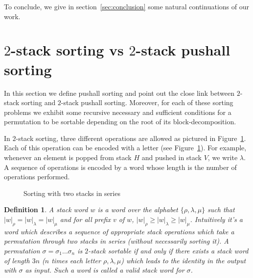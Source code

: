 \documentclass[11pt]{article}
\newtheorem{defn}[thm]{Definition}
\begin{document}
To conclude, we give in section~\ref{sec:conclusion} some natural continuations of our work.


\section{$2$-stack sorting vs $2$-stack pushall sorting}

In this section we define pushall sorting and point out the close link between $2$-stack sorting and $2$-stack pushall sorting. 
Moreover, for each of these sorting problems we exhibit some recursive necessary and sufficient conditions for a permutation to be sortable depending on the root of its block-decomposition.

In $2$-stack sorting, three different operations are allowed as pictured in Figure~\ref{fig:rholambdamu}. 
Each of this operation can be encoded with a letter (see Figure~\ref{fig:rholambdamu}).
For example, whenever an element is popped from stack $H$ and pushed in stack $V$, we write $\lambda$. 
A sequence of operations is encoded by a word whose length is the number of operations performed.

\begin{figure}[H]
\begin{center}
\caption{Sorting with two stacks in series \label{fig:rholambdamu}}
\end{center}
\end{figure}

\begin{defn}
A {\em stack word} $w$ is a word over the alphabet $\{ \rho, \lambda, \mu \}$ such that $|w|_\rho = |w|_\lambda = |w|_\mu$ and for all prefix $v$ of $w$, $|w|_\rho \geq |w|_\lambda \geq |w|_\mu$. 
Intuitively it's a word which describes a sequence of appropriate stack operations which take a permutation through two stacks in series (without necessarily sorting it).
A permutation $\sigma = \sigma_1\ldots \sigma_n$ is $2$-stack sortable if and only if there exists a stack word of length $3n$ ($n$ times each letter $\rho,\lambda, \mu$) which leads to the identity in the output with $\sigma$ as input. 
Such a word is called a {\em valid} stack word for $\sigma$.
\end{defn}
\end{document}

